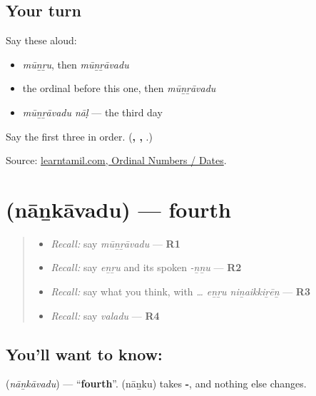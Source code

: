 \subsection*{Your turn}
Say these aloud:

\begin{itemize}
\raggedright
  \item \emph{mūṉṟu}, then \emph{mūṉṟāvadu}
  \item the ordinal before this one, then \emph{mūṉṟāvadu}
  \item \emph{mūṉṟāvadu nāḷ} — the third day
\end{itemize}

\begin{tcolorbox}[breakable,colback=teal!4,colframe=teal!35!black,title={Before you move on}]
Say the first three in order. (\textbf{, , }.)

Source: \href{https://www.learntamil.com/part1/ch02/ordinal-numbers-dates/}{learntamil.com, Ordinal Numbers / Dates}.
\end{tcolorbox}
\section[\texorpdfstring{\ta{நான்காவது} (nāṉkāvadu)}{நான்காவது (nāṉkāvadu)}]{ (nāṉkāvadu) — fourth}

\label{lesson:TA-C82-fourth}



\begin{quote}
\begin{itemize}
\raggedright
  \item \emph{Recall:} say \emph{mūṉṟāvadu} — \textbf{R1}
  \item \emph{Recall:} say \emph{eṉṟu} and its spoken \emph{-ṉṉu} — \textbf{R2}
  \item \emph{Recall:} say what you think, with \emph{… eṉṟu niṉaikkiṟēṉ} — \textbf{R3}
  \item \emph{Recall:} say \emph{valadu} — \textbf{R4}
\end{itemize}
\end{quote}

\subsection*{You'll want to know: }
\textbf{} (\emph{nāṉkāvadu}) — \textquotedblleft{}\textbf{fourth}\textquotedblright{}. \textbf{} (nāṉku) takes \textbf{-}, and nothing else changes.

